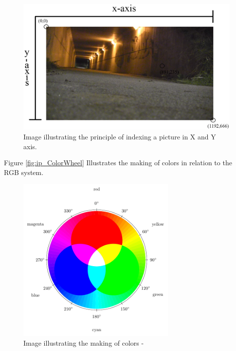 \begin{figure}[htbp]
\centering
\includegraphics[width=1.00\textwidth]{Pictures/Theory/IndexingAPicture.png}
\caption{Image illustrating the principle of indexing a picture in X and Y axis.}
\label{fig:ip_IndexingAPicture}
\end{figure}

Figure \eqref{fig:ip_ColorWheel} Illustrates the making of colors in relation to the RGB system.\\
\begin{figure}[htbp]
\centering
\includegraphics[width=0.70\textwidth]{Pictures/Theory/RGBColor.pdf}
\caption{Image illustrating the making of colors - \citep{colorMixing}}
\label{fig:ip_ColorWheel}
\end{figure}  


